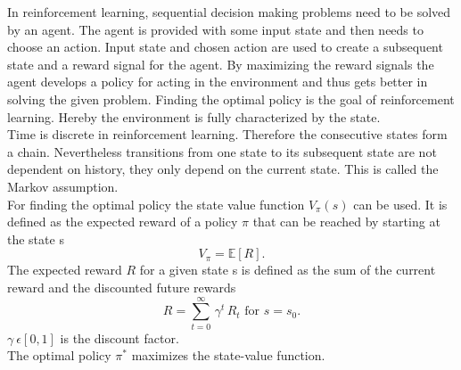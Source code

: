 In reinforcement learning, sequential decision making problems need to be solved by an agent. The agent is provided with some input state and then needs to choose an action. Input state and chosen action are used to create a subsequent state and a reward signal for the agent. By maximizing the reward signals the agent develops a policy for acting in the environment and thus gets better in solving the given problem. Finding the optimal policy is the goal of reinforcement learning.
Hereby the environment is fully characterized by the state. \\
Time is discrete in reinforcement learning. Therefore the consecutive states form a chain.
Nevertheless transitions from one state to its subsequent state are not dependent on history, they only depend on the current state. This is called the Markov assumption. \\
For finding the optimal policy the state value function $V_\pi(s)$ can be used. It is defined as the expected reward of a policy $\pi$ that can be reached by starting at the state s
\begin{equation}
V_\pi=\mathbb{E}\left[R\right].
\end{equation}
The expected reward $R$ for a given state s is defined as the sum of the current reward and the discounted future rewards
\begin{equation}
R=\sum^\infty_{t=0}\,\gamma^t\,R_t \textrm{ for } s=s_0.
\end{equation}
$\gamma\:\epsilon\left[0,1\right]$ is the discount factor.\\
The optimal policy $\pi^*$ maximizes the state-value function.